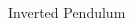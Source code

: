 \documentclass[xcolor=x11names,12pt]{beamer}
\begin{document}
\begin{frame}
\begin{columns}
    \begin{column}{.48\textwidth}
      \begin{block}{Inverted Pendulum}
        \centering
        \fontsize{11pt}{11pt}\selectfont
      \end{block}
    \end{column}
  \end{columns}



\end{frame}
\end{document}
